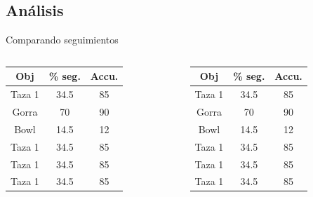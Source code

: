 \documentclass[]{beamer}
\begin{document}
\subsection{Análisis}
\begin{frame}[t]{Comparando seguimientos}
    \small
    \begin{columns}
        \begin{column}{4cm}
            \begin{tabular}{|c|c|c|}
                \hline
                Obj     & \% seg. & Accu. \\
                \hline
                Taza 1  & 34.5    & 85    \\
                \hline
                Gorra   & 70      & 90    \\
                \hline
                Bowl    & 14.5    & 12    \\
                \hline
                \hline
                Taza 1  & 34.5    & 85    \\
                \hline
                Taza 1  & 34.5    & 85    \\
                \hline
                Taza 1  & 34.5    & 85    \\
                \hline
            \end{tabular}
        \end{column}
        \begin{column}{4cm}
            \begin{tabular}{|c|c|c|}
                \hline
                Obj     & \% seg. & Accu. \\
                \hline
                Taza 1  & 34.5    & 85    \\
                \hline
                Gorra   & 70      & 90    \\
                \hline
                Bowl    & 14.5    & 12    \\
                \hline
                \hline
                Taza 1  & 34.5    & 85    \\
                \hline
                Taza 1  & 34.5    & 85    \\
                \hline
                Taza 1  & 34.5    & 85    \\
                \hline
            \end{tabular}
        \end{column}
    \end{columns}

\end{frame}
\end{document}
